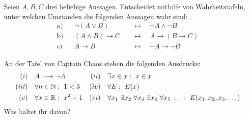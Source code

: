 	
\begin{aufg}[Wahrheitstafeln]
    Seien $A,B,C$ drei beliebige Aussagen. Entscheidet mithilfe von Wahrheitstafeln, unter welchen Umständen die folgenden Aussagen wahr sind:
    \begin{align*}
        \text{a)} && \neg (A \lor B) \quad & \leftrightarrow \quad \neg A\land \neg B \\
        \text{b)} && (A\land B)\to C \quad&\leftrightarrow\quad A\to (B\to C) \\
        \text{c)} && A\to B \quad&\leftrightarrow\quad \neg A \to \neg B
    \end{align*}
\end{aufg}


\begin{aufg}
    An der Tafel von Captain Chaos stehen die folgenden Ausdrücke:
    \begin{align*}
        (i)\quad& A\ {\neg}{\to}\ \neg A&(ii)\quad& \exists x\in x:\ x\in x  \\
        (iii)\quad&   \forall n\in \N:\ 1<3 & (iv)\quad& \forall E :\ E(x) \\
        (v)\quad& \forall x\in \R :\ x^2+1 &(vi)\quad& \forall x_1\ \exists x_2\ \forall x_3\ \exists x_4\ \forall x_5\ \ldots:\ E(x_1,x_2,x_3,\dots)
    \end{align*}
    Was haltet ihr davon?
\end{aufg}

